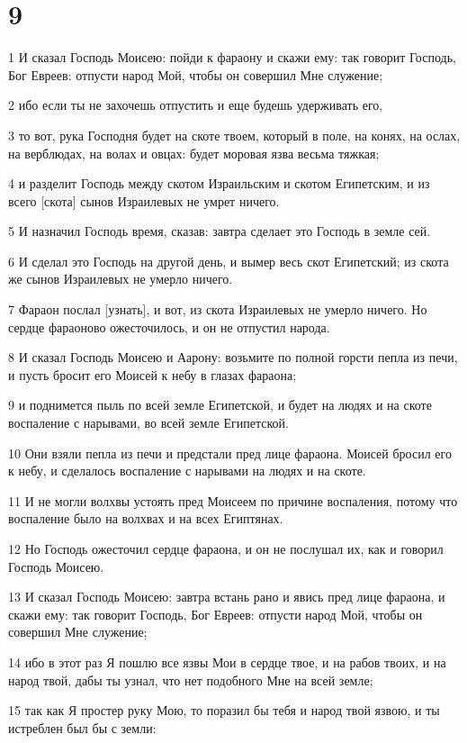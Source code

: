 \chapter{9}

\par 1 И сказал Господь Моисею: пойди к фараону и скажи ему: так говорит Господь, Бог Евреев: отпусти народ Мой, чтобы он совершил Мне служение;
\par 2 ибо если ты не захочешь отпустить и еще будешь удерживать его,
\par 3 то вот, рука Господня будет на скоте твоем, который в поле, на конях, на ослах, на верблюдах, на волах и овцах: будет моровая язва весьма тяжкая;
\par 4 и разделит Господь между скотом Израильским и скотом Египетским, и из всего [скота] сынов Израилевых не умрет ничего.
\par 5 И назначил Господь время, сказав: завтра сделает это Господь в земле сей.
\par 6 И сделал это Господь на другой день, и вымер весь скот Египетский; из скота же сынов Израилевых не умерло ничего.
\par 7 Фараон послал [узнать], и вот, из скота Израилевых не умерло ничего. Но сердце фараоново ожесточилось, и он не отпустил народа.
\par 8 И сказал Господь Моисею и Аарону: возьмите по полной горсти пепла из печи, и пусть бросит его Моисей к небу в глазах фараона;
\par 9 и поднимется пыль по всей земле Египетской, и будет на людях и на скоте воспаление с нарывами, во всей земле Египетской.
\par 10 Они взяли пепла из печи и предстали пред лице фараона. Моисей бросил его к небу, и сделалось воспаление с нарывами на людях и на скоте.
\par 11 И не могли волхвы устоять пред Моисеем по причине воспаления, потому что воспаление было на волхвах и на всех Египтянах.
\par 12 Но Господь ожесточил сердце фараона, и он не послушал их, как и говорил Господь Моисею.
\par 13 И сказал Господь Моисею: завтра встань рано и явись пред лице фараона, и скажи ему: так говорит Господь, Бог Евреев: отпусти народ Мой, чтобы он совершил Мне служение;
\par 14 ибо в этот раз Я пошлю все язвы Мои в сердце твое, и на рабов твоих, и на народ твой, дабы ты узнал, что нет подобного Мне на всей земле;
\par 15 так как Я простер руку Мою, то поразил бы тебя и народ твой язвою, и ты истреблен был бы с земли:
